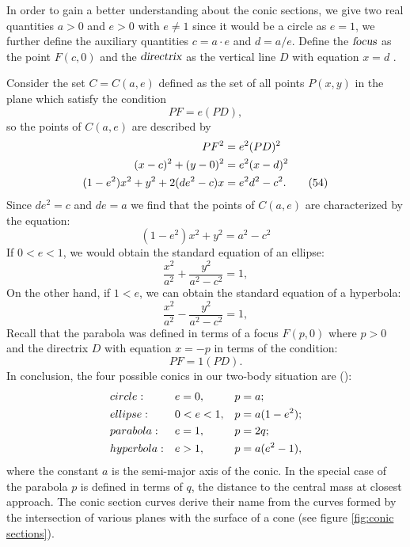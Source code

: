 In order to gain a better understanding about the conic sections, we give two real quantities $a > 0$ and $e > 0$ with $e \ne 1$ since it would be a circle as $e=1$, we further define the auxiliary quantities $c = a \cdot e$ and $d = a/e$.
Define the $\textsl{focus}$ as the point $F(c,0)$ and the $\textsl{directrix}$ as the vertical line $D$ with equation $x = d$ .

Consider the set $C = C(a,e)$ defined as the set of all points $P(x,y)$ in the plane which satisfy the condition
\begin{equation}
    PF = e ( PD ),
    \tag{53}
\end{equation}
so the points of $C(a,e)$ are described by
\begin{align}
    PF^2 & = e^2 (PD)^2 \notag\\
    (x - c)^2 + (y - 0)^2 & = e^2 (x - d)^2 \notag\\
    (1 - e^2)x^2 + y^2 + 2(de^2 - c)x & = e^2 d^2 - c^2. 
    \tag{54}
\end{align}
Since $de^2 = c$ and $de = a$ we find that the points of $C(a,e)$ are characterized by the equation:
\begin{equation}
    (1 - e^2)x^2 + y^2 = a^2 - c^2 
    \tag{55}
\end{equation}
If $0<e<1$, we would obtain the standard equation of an ellipse:
\begin{equation}
    \frac{x^2}{a^2} + \frac{y^2}{a^2 - c^2} = 1,
    \tag{56}
\end{equation}
On the other hand, if $1<e$, we can obtain the standard equation of a hyperbola:
\begin{equation}
    \frac{x^2}{a^2} - \frac{y^2}{a^2 - c^2} = 1,
    \tag{57}
\end{equation}
Recall that the parabola was defined in terms of a focus $F(p,0)$ where $p > 0$ and the directrix $D$ with equation $x = -p$ in terms of the condition:
\begin{equation}
    PF = 1 ( PD ).
    \tag{58}
\end{equation}
In conclusion, the four possible conics in our two-body situation are (\cite{CURTIS2014xi}):
\begin{align}
    & circle: && e = 0, && p=a; \notag\\
    & ellipse: && 0 < e < 1, && p=a(1-e^2); \notag\\
    & parabola: && e = 1, && p = 2q; \notag\\
    & hyperbola: && e > 1, && p = a(e^2-1), \notag
\end{align}
where the constant $a$ is the semi-major axis of the conic. In the special case of the parabola $p$ is defined in terms of $q$, the distance to the central mass at closest approach. The conic section curves derive their name from the curves formed by the intersection of various planes with the surface of a cone (see figure \ref{fig:conic sections}).

